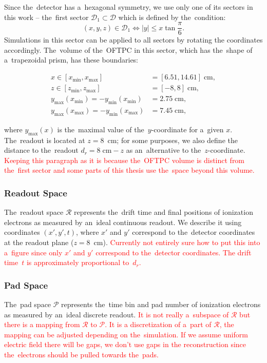 				Since the~detector has a~hexagonal symmetry, we use only one of its sectors in this work -- the~first sector $\mathcal{D}_1 \subset \mathcal{D}$ which is defined by the~condition:
					\begin{equation}
						(x,y,z) \in \mathcal{D}_1 \Leftrightarrow |y| \leq x\tan \frac{\pi}{6}.
					\end{equation}
				Simulations in this sector can be applied to all sectors by rotating the coordinates accordingly. The~volume of the~\ac{OFTPC} in this sector, which has the~shape of a~trapezoidal prism, has these boundaries:
					\begin{linenomath}
						\begin{align}
							x \in [x_\text{min},x_\text{max}] &= [6.51, 14.61] \;\text{cm},\\
							z \in [z_\text{min},z_\text{max}] &= [-8,8] \;\text{cm},\\
							y_\text{max}(x_\text{min}) = -y_\text{min}(x_\text{min}) &=  2.75\;\text{cm},\\
							y_\text{max}(x_\text{max}) = -y_\text{min}(x_\text{max}) &=  7.45\;\text{cm},
						\end{align}
					\end{linenomath}
				where $y_\text{max}(x)$ is the~maximal value of the~$y$-coordinate for a~given $x$. The~readout is located at $z = 8$~cm; for some purposes, we also define the distance to the~readout $d_r = 8\;\text{cm}-z$ as an~alternative to the~$z$-coordinate. \textcolor{red}{Keeping this paragraph as it is because the~\ac{OFTPC} volume is distinct from the~first sector and some parts of this thesis use the~space beyond this volume.}
			
			\subsubsection{Readout Space}
				The~readout space $\mathcal{R}$ represents the~drift time and final positions of ionization electrons as measured by an~ideal continuous readout. We describe it using coordinates $(x',y',t)$, where $x'$ and $y'$ correspond to the~detector coordinates at the readout plane ($z = 8$~cm). \textcolor{red}{Currently not entirely sure how to put this into a~figure since only $x'$ and $y'$ correspond to the~detector coordinates. The drift time~$t$ is approximately proportional to~$d_r$.}
			
			\subsubsection{Pad Space}
				The~pad space $\mathcal{P}$ represents the~time bin and pad number of ionization electrons as measured by an~ideal discrete readout. \textcolor{red}{It is not really a~subspace of $\mathcal{R}$ but there is a mapping from $\mathcal{R}$ to $\mathcal{P}$. It is a discretization of a~part of $\mathcal{R}$, the mapping can be adjusted depending on the~simulation. If we assume uniform electric field there will be gaps, we don't use gaps in the reconstruction since the~electrons should be pulled towards the~pads.}
				
